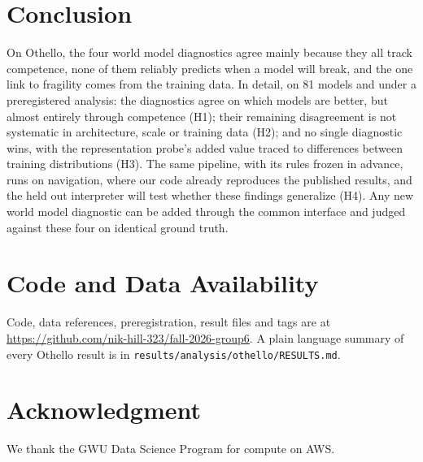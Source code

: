 \documentclass[journal]{IEEEtran}
\begin{document}
\section{Conclusion}
On Othello, the four world model diagnostics agree mainly because they all track competence, none of them reliably
predicts when a model will break, and the one link to fragility comes from the training data. In detail, on 81
models and under a preregistered analysis: the diagnostics agree on which models are better, but almost entirely
through competence (H1); their remaining disagreement is not systematic in architecture, scale or training data
(H2); and no single diagnostic wins, with the representation probe's added value traced to differences between
training distributions (H3). The same pipeline, with its rules frozen in advance, runs on navigation, where our code
already reproduces the published results, and the held out interpreter will test whether these findings generalize
(H4). Any new world model diagnostic can be added through the common interface and judged against these four on
identical ground truth.

\section*{Code and Data Availability}
Code, data references, preregistration, result files and tags are at
\url{https://github.com/nik-hill-323/fall-2026-group6}. A plain language summary of every Othello result is in
\texttt{results/analysis/othello/RESULTS.md}.

\section*{Acknowledgment}
We thank the GWU Data Science Program for compute on AWS.

\balance


\end{document}
